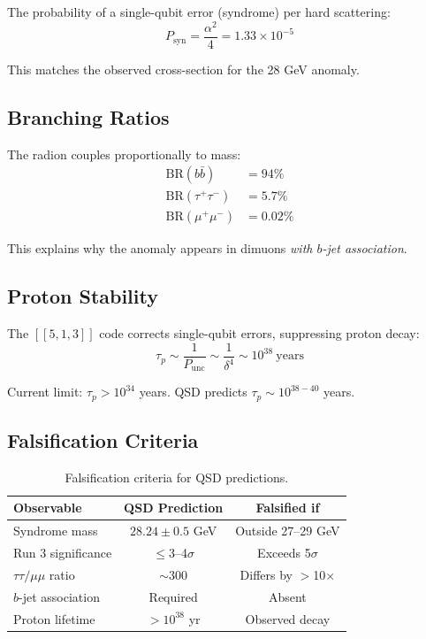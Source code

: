 \documentclass[11pt,a4paper]{article}
\theoremstyle{definition}
\newcommand{\dgeo}{\delta}              %
\newcommand{\Psyn}{P_{\text{syn}}}      %
\newcommand{\Punc}{P_{\text{unc}}}      %
\begin{document}
The probability of a single-qubit error (syndrome) per hard scattering:
\begin{equation}
\Psyn = \frac{\alpha^2}{4} = 1.33 \times 10^{-5}
\end{equation}

This matches the observed cross-section for the 28 GeV anomaly.

\subsection{Branching Ratios}

The radion couples proportionally to mass:
\begin{align}
\text{BR}(b\bar{b}) &= 94\% \\
\text{BR}(\tau^+\tau^-) &= 5.7\% \\
\text{BR}(\mu^+\mu^-) &= 0.02\%
\end{align}

This explains why the anomaly appears in dimuons \emph{with $b$-jet association}.

\subsection{Proton Stability}

The $[[5,1,3]]$ code corrects single-qubit errors, suppressing proton decay:
\begin{equation}
\tau_p \sim \frac{1}{\Punc} \sim \frac{1}{\dgeo^4} \sim 10^{38}~\text{years}
\end{equation}

Current limit: $\tau_p > 10^{34}$ years. QSD predicts $\tau_p \sim 10^{38-40}$ years.

\subsection{Falsification Criteria}

\begin{table}[h]
\centering
\begin{tabular}{lcc}
\toprule
\textbf{Observable} & \textbf{QSD Prediction} & \textbf{Falsified if} \\
\midrule
Syndrome mass & $28.24 \pm 0.5$ GeV & Outside 27--29 GeV \\
Run 3 significance & $\leq$3--4$\sigma$ & Exceeds 5$\sigma$ \\
$\tau\tau/\mu\mu$ ratio & $\sim$300 & Differs by $>$10$\times$ \\
$b$-jet association & Required & Absent \\
Proton lifetime & $>10^{38}$ yr & Observed decay \\
\bottomrule
\end{tabular}
\caption{Falsification criteria for QSD predictions.}
\label{tab:falsification}
\end{table}
\end{document}
